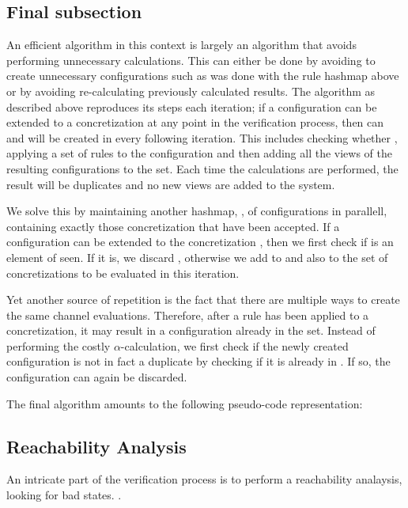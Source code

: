 \subsection{Final subsection}
An efficient algorithm in this context is largely an algorithm that avoids performing unnecessary calculations. This can either be done by avoiding to create unnecessary configurations such as was done with the rule hashmap above or by avoiding re-calculating previously calculated results. The algorithm as described above reproduces its steps each iteration; if a configuration  can be extended to a concretization  at any point in the verification process, then  can and will be created in every following iteration. This includes checking whether , applying a set of rules to the configuration and then adding all the views of the resulting configurations to the set. Each time the calculations are performed, the result will be duplicates and no new views are added to the system.

We solve this by maintaining another hashmap, , of configurations in parallell, containing exactly those concretization that have been accepted. If a configuration  can be extended to the concretization , then we first check if  is an element of seen. If it is, we discard , otherwise we add  to  and also to the set of concretizations to be evaluated in this iteration.

Yet another source of repetition is the fact that there are multiple ways to create the same channel evaluations. Therefore, after a rule has been applied to a concretization, it may result in a configuration already in the set. Instead of performing the costly $\alpha$-calculation, we first check if the newly created configuration is not in fact a duplicate by checking if it is already in . If so, the configuration can again be discarded.

The final algorithm amounts to the following pseudo-code representation:

\subsection{Reachability Analysis}
An intricate part of the verification process is to perform a reachability analaysis, looking for bad states. 
.

